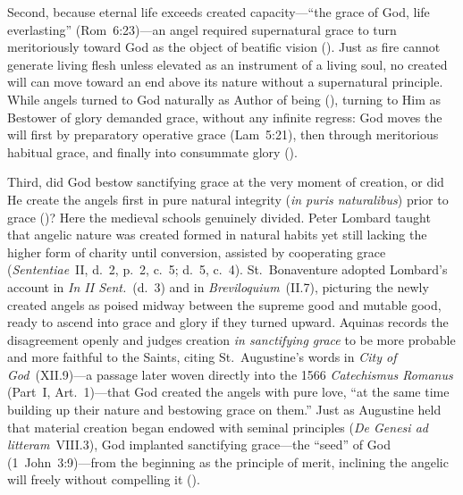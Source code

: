 Second, because eternal life exceeds created capacity---``the grace of God, life everlasting'' (Rom~6:23)---an angel required supernatural grace to turn meritoriously toward God as the object of beatific vision (). Just as fire cannot generate living flesh unless elevated as an instrument of a living soul, no created will can move toward an end above its nature without a supernatural principle. While angels turned to God naturally as Author of being (), turning to Him as Bestower of glory demanded grace, without any infinite regress: God moves the will first by preparatory operative grace (Lam~5:21), then through meritorious habitual grace, and finally into consummate glory ().

Third, did God bestow sanctifying grace at the very moment of creation, or did He create the angels first in pure natural integrity (\emph{in puris naturalibus}) prior to grace ()? Here the medieval schools genuinely divided. Peter Lombard taught that angelic nature was created formed in natural habits yet still lacking the higher form of charity until conversion, assisted by cooperating grace (\emph{Sententiae}~II, d.~2, p.~2, c.~5; d.~5, c.~4). St.~Bonaventure adopted Lombard's account in \emph{In II Sent.}~(d.~3) and in \emph{Breviloquium}~(II.7), picturing the newly created angels as poised midway between the supreme good and mutable good, ready to ascend into grace and glory if they turned upward. Aquinas records the disagreement openly and judges creation \emph{in sanctifying grace} to be more probable and more faithful to the Saints, citing St.~Augustine's words in \emph{City of God}~(XII.9)---a passage later woven directly into the 1566 \emph{Catechismus Romanus} (Part~I, Art.~1)---that God created the angels with pure love, ``at the same time building up their nature and bestowing grace on them.'' Just as Augustine held that material creation began endowed with seminal principles (\emph{De Genesi ad litteram}~VIII.3), God implanted sanctifying grace---the ``seed'' of God (1~John~3:9)---from the beginning as the principle of merit, inclining the angelic will freely without compelling it ().

